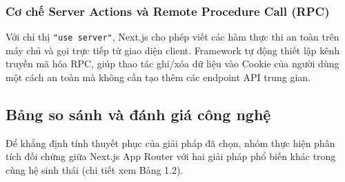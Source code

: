 \documentclass[13pt,a4paper]{extarticle}
\begin{document}
\subsubsection{Cơ chế Server Actions và Remote Procedure Call (RPC)}
Với chỉ thị \texttt{"use server"}, Next.js cho phép viết các hàm thực thi an toàn trên máy chủ và gọi trực tiếp từ giao diện client. Framework tự động thiết lập kênh truyền mã hóa RPC, giúp thao tác ghi/xóa dữ liệu vào Cookie của người dùng một cách an toàn mà không cần tạo thêm các endpoint API trung gian.

\subsection{Bảng so sánh và đánh giá công nghệ}
Để khẳng định tính thuyết phục của giải pháp đã chọn, nhóm thực hiện phân tích đối chứng giữa Next.js App Router với hai giải pháp phổ biến khác trong cùng hệ sinh thái (chi tiết xem Bảng 1.2).
\end{document}
